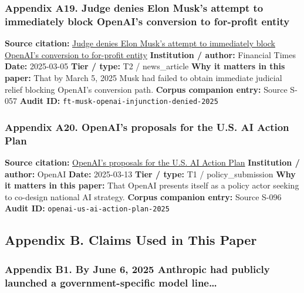 \documentclass[
  american,
  11pt,
  letterpaper,
]{article}
\begin{document}
\subsubsection{Appendix A19. Judge denies Elon Musk's attempt to
immediately block OpenAI's conversion to for-profit
entity}\label{ch-08-appendix-a19-judge-denies-elon-musks-attempt-to-immediately-block-openais-conversion-to-for-profit-entity}

\textbf{Source citation:}
\href{https://www.ft.com/content/532931dd-e1c0-4f18-a8af-5777dd70a52d}{Judge
denies Elon Musk's attempt to immediately block OpenAI's conversion to
for-profit entity} \textbf{Institution / author:} Financial Times
\textbf{Date:} 2025-03-05 \textbf{Tier / type:} T2 / news\_article
\textbf{Why it matters in this paper:} That by March 5, 2025 Musk had
failed to obtain immediate judicial relief blocking OpenAI's conversion
path. \textbf{Corpus companion entry:} Source S-057 \textbf{Audit ID:}
\texttt{ft-musk-openai-injunction-denied-2025}

\subsubsection{Appendix A20. OpenAI's proposals for the U.S. AI Action
Plan}\label{ch-08-appendix-a20-openais-proposals-for-the-us-ai-action-plan}

\textbf{Source citation:}
\href{https://openai.com/global-affairs/openai-proposals-for-the-us-ai-action-plan/}{OpenAI's
proposals for the U.S. AI Action Plan} \textbf{Institution / author:}
OpenAI \textbf{Date:} 2025-03-13 \textbf{Tier / type:} T1 /
policy\_submission \textbf{Why it matters in this paper:} That OpenAI
presents itself as a policy actor seeking to co-design national AI
strategy. \textbf{Corpus companion entry:} Source S-096 \textbf{Audit
ID:} \texttt{openai-us-ai-action-plan-2025}

\subsection{Appendix B. Claims Used in This
Paper}\label{appendix-b.-claims-used-in-this-paper-8}

\subsubsection{Appendix B1. By June 6, 2025 Anthropic had publicly
launched a government-specific model
line\ldots{}}\label{ch-08-appendix-b1-by-june-6-2025-anthropic-had-publicly-launched-a-government-specific-model-line}
\end{document}
